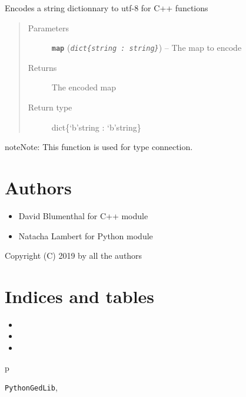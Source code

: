 \documentclass[letterpaper,10pt,english]{sphinxmanual}
\begin{document}

\begin{fulllineitems}
\label{doc:PythonGedLib.encodeYourMap}
Encodes a string dictionnary to utf-8 for C++ functions
\begin{quote}\begin{description}
\item[{Parameters}] \leavevmode
\textbf{\texttt{map}} (\emph{\texttt{dict\{string : string\}}}) -- The map to encode

\item[{Returns}] \leavevmode
The encoded map

\item[{Return type}] \leavevmode
dict\{`b'string : `b'string\}

\end{description}\end{quote}

\begin{notice}{note}{Note:}
This function is used for type connection.
\end{notice}

\end{fulllineitems}



\chapter{Authors}
\label{index:authors}\begin{itemize}
\item {} 
David Blumenthal for C++ module

\item {} 
Natacha Lambert for Python module

\end{itemize}

Copyright (C) 2019 by all the authors


\chapter{Indices and tables}
\label{index:indices-and-tables}\begin{itemize}
\item {} 

\item {} 

\item {} 

\end{itemize}


\renewcommand{\indexname}{Python Module Index}
\begin{theindex}
\def\bigletter#1{{\Large\sffamily#1}\nopagebreak\vspace{1mm}}
\bigletter{p}
\item {\texttt{PythonGedLib}}, \pageref{doc:module-PythonGedLib}
\end{theindex}

\renewcommand{\indexname}{Index}
\printindex
\end{document}
